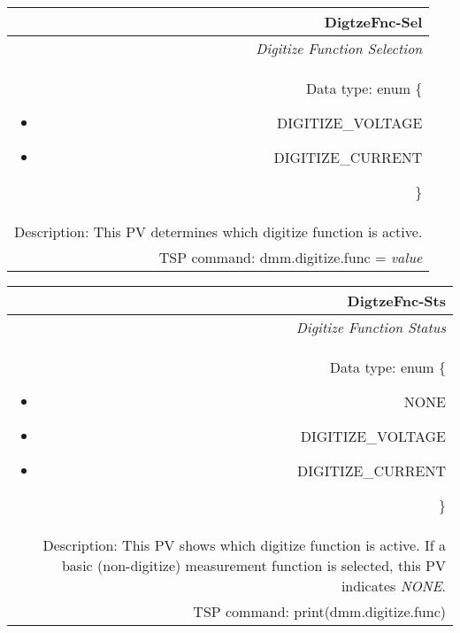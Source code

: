 \documentclass[openany]{article}
\begin{document}
		\begin{tabular}{N}
			\hline
			\bfseries DigtzeFnc-Sel\label{pv:digtzefnc-sel} \\ \hline
			\emph{Digitize Function Selection} \\
			Data type: enum \{\begin{itemize}[noitemsep]
				\small
				\item[] DIGITIZE\_VOLTAGE
				\item[] DIGITIZE\_CURRENT
			\end{itemize}\} \\
			Description: This PV determines which digitize function is active. \\
			TSP command: dmm.digitize.func = \emph{value}
		\end{tabular}

		\begin{tabular}{N}
			\hline
			\bfseries DigtzeFnc-Sts\label{pv:digtzefnc-sts} \\ \hline
			\emph{Digitize Function Status} \\
			Data type: enum \{\begin{itemize}[noitemsep]
				\small
				\item[] NONE
				\item[] DIGITIZE\_VOLTAGE
				\item[] DIGITIZE\_CURRENT
			\end{itemize}\} \\
			Description: This PV shows which digitize function is active. If a basic (non-digitize) measurement function is selected, this PV indicates \emph{NONE}. \\
			TSP command: print(dmm.digitize.func)
		\end{tabular}
\end{document}

